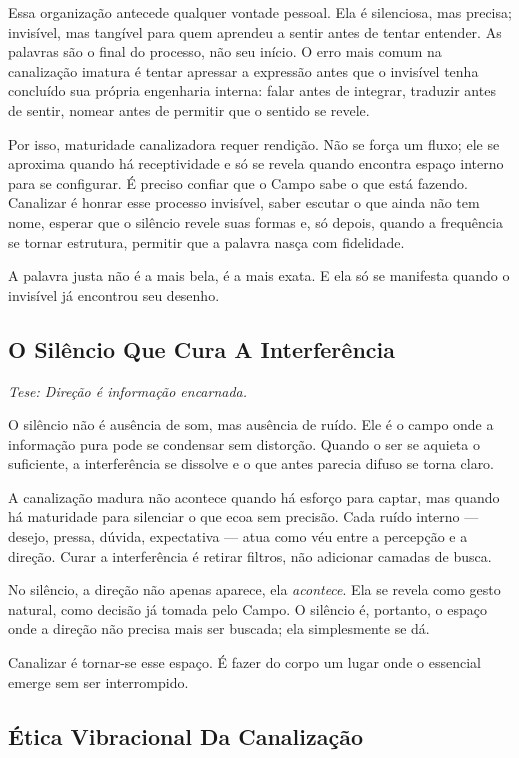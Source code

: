 \documentclass[12pt]{book}
\begin{document}
Essa organização antecede qualquer vontade pessoal. Ela é silenciosa, mas precisa; invisível, mas tangível para quem aprendeu a sentir antes de tentar entender. As palavras são o final do processo, não seu início. O erro mais comum na canalização imatura é tentar apressar a expressão antes que o invisível tenha concluído sua própria engenharia interna: falar antes de integrar, traduzir antes de sentir, nomear antes de permitir que o sentido se revele.

Por isso, maturidade canalizadora requer rendição. Não se força um fluxo; ele se aproxima quando há receptividade e só se revela quando encontra espaço interno para se configurar. É preciso confiar que o Campo sabe o que está fazendo. Canalizar é honrar esse processo invisível, saber escutar o que ainda não tem nome, esperar que o silêncio revele suas formas e, só depois, quando a frequência se tornar estrutura, permitir que a palavra nasça com fidelidade.

A palavra justa não é a mais bela, é a mais exata. E ela só se manifesta quando o invisível já encontrou seu desenho.

\subsection*{O Silêncio Que Cura A Interferência}

\textit{Tese: Direção é informação encarnada.}

O silêncio não é ausência de som, mas ausência de ruído. Ele é o campo onde a informação pura pode se condensar sem distorção. Quando o ser se aquieta o suficiente, a interferência se dissolve e o que antes parecia difuso se torna claro.

A canalização madura não acontece quando há esforço para captar, mas quando há maturidade para silenciar o que ecoa sem precisão. Cada ruído interno --- desejo, pressa, dúvida, expectativa --- atua como véu entre a percepção e a direção. Curar a interferência é retirar filtros, não adicionar camadas de busca.

No silêncio, a direção não apenas aparece, ela \textit{acontece}. Ela se revela como gesto natural, como decisão já tomada pelo Campo. O silêncio é, portanto, o espaço onde a direção não precisa mais ser buscada; ela simplesmente se dá.

Canalizar é tornar-se esse espaço. É fazer do corpo um lugar onde o essencial emerge sem ser interrompido.

\subsection*{Ética Vibracional Da Canalização}
\end{document}
